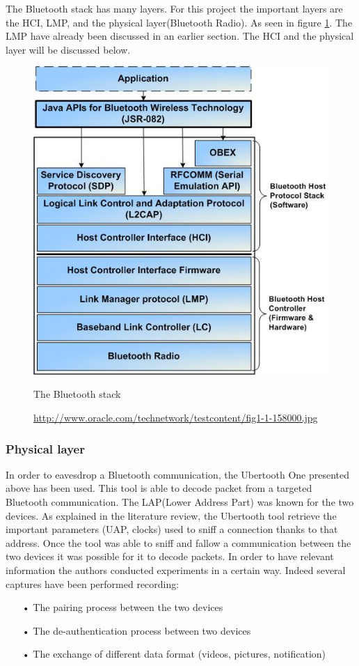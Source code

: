 The Bluetooth stack has many layers. For this project the important layers are the HCI, LMP, and the physical layer(Bluetooth Radio). As seen in figure \ref{fig:bt_stack}. The LMP have already been discussed in an earlier section. The HCI and the physical layer will be discussed below.

\begin{figure}[h]
  \includegraphics[scale=0.8]{images/bluetoothstack.jpg}
  \caption{The Bluetooth stack}
  \label{fig:bt_stack}
  \caption*{\url{http://www.oracle.com/technetwork/testcontent/fig1-1-158000.jpg}}
\end{figure}
\newpage
\subsubsection{Physical layer}
	In order to eavesdrop a Bluetooth communication, the Ubertooth One presented above has been used. This tool is able to decode packet from a targeted Bluetooth communication.
	The LAP(Lower Address Part) was known for the two devices. As explained in the literature review, the Ubertooth tool retrieve the important parameters (UAP, clocks) used to sniff a connection thanks to that address. Once the tool was able to sniff and fallow a communication between the two devices it was possible for it to decode packets.
	In order to have relevant information the authors conducted experiments in a certain way. Indeed several captures have been performed recording:
\begin{itemize}
	\item[•] The pairing process between the two devices
	\item[•] The de-authentication process between two devices
	\item[•] The exchange of different data format (videos, pictures, notification) 
\end{itemize}
		 
